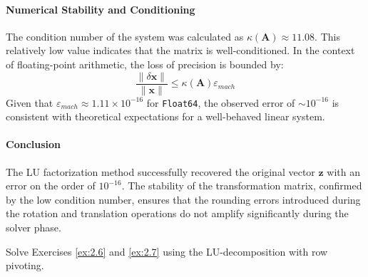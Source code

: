 \begin{solution}
  \paragraph{Numerical Stability and Conditioning}
  The condition number of the system was calculated as $\kappa(\mathbf{A}) \approx 11.08$. This relatively low value indicates that the matrix is well-conditioned. In the context of floating-point arithmetic, the loss of precision is bounded by:
  \[
  \frac{\|\delta \mathbf{x}\|}{\|\mathbf{x}\|} \le \kappa(\mathbf{A}) \varepsilon_{mach}
  \]
  Given that $\varepsilon_{mach} \approx 1.11 \times 10^{-16}$ for \texttt{Float64}, the observed error of $\sim 10^{-16}$ is consistent with theoretical expectations for a well-behaved linear system.

  \paragraph{Conclusion}
  The LU factorization method successfully recovered the original vector $\mathbf{z}$ with an error on the order of $10^{-16}$. The stability of the transformation matrix, confirmed by the low condition number, ensures that the rounding errors introduced during the rotation and translation operations do not amplify significantly during the solver phase.
\end{solution}



\begin{exercise}
    Solve Exercises \ref{ex:2.6} and \ref{ex:2.7} using the LU-decomposition with row pivoting.
\end{exercise}

